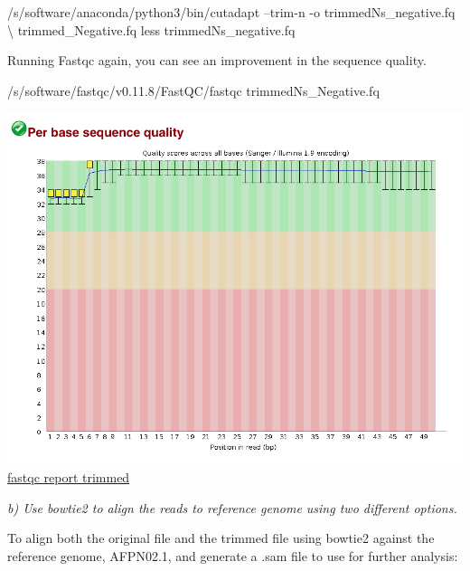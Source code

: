 \documentclass[12pt,]{article}
\newenvironment{Shaded}{\begin{snugshade}}{\end{snugshade}}
\newcommand{\FunctionTok}[1]{\textcolor[rgb]{0.00,0.00,0.00}{#1}}
\newcommand{\VariableTok}[1]{\textcolor[rgb]{0.00,0.00,0.00}{#1}}
\newcommand{\OperatorTok}[1]{\textcolor[rgb]{0.81,0.36,0.00}{\textbf{#1}}}
\newcommand{\BuiltInTok}[1]{#1}
\newcommand{\ExtensionTok}[1]{#1}
\newcommand{\NormalTok}[1]{#1}
\begin{document}
\begin{Shaded}
\begin{Highlighting}[]
\ExtensionTok{/s/software/anaconda/python3/bin/cutadapt}\NormalTok{ --trim-n -o trimmedNs_negative.fq \textbackslash{}}
\NormalTok{trimmed_Negative.fq}
\FunctionTok{less}\NormalTok{ trimmedNs_negative.fq}
\end{Highlighting}
\end{Shaded}

Running Fastqc again, you can see an improvement in the sequence
quality.

\begin{Shaded}
\begin{Highlighting}[]
\ExtensionTok{/s/software/fastqc/v0.11.8/FastQC/fastqc}\NormalTok{ trimmedNs_Negative.fq}
\end{Highlighting}
\end{Shaded}

\includegraphics{trimmedNs_negative_fastqc.png}\\

\href{/d/projects/u/sj003/course_materials/fastq/coursework_1/trimmedNs_Negative_fastqc.html}{fastqc
report trimmed}

\emph{b) Use bowtie2 to align the reads to reference genome using two
different options.}

To align both the original file and the trimmed file using bowtie2
against the reference genome, AFPN02.1, and generate a .sam file to use
for further analysis:

\begin{Shaded}
\end{Shaded}
\end{document}
